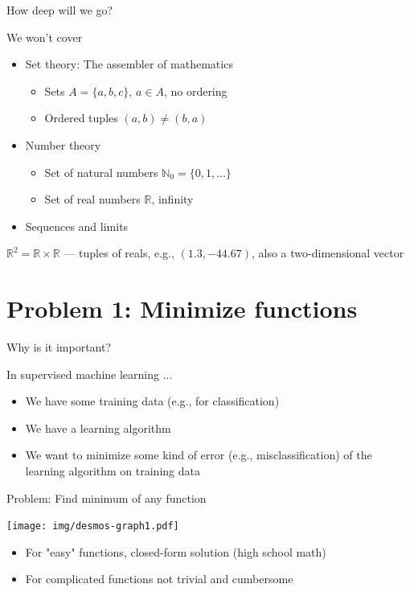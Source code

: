 \documentclass[12pt,aspectratio=169,handout]{beamer}
\begin{document}
\begin{frame}{How deep will we go?}
	
	We won't cover
	
	\begin{itemize}
		\item Set theory: The assembler of mathematics
		\begin{itemize}
			\item Sets $A = \{a, b, c\}$, $a \in A$, no ordering
			\item Ordered tuples $(a, b) \neq (b, a)$
		\end{itemize}
		\pause
		\item Number theory
		\begin{itemize}
			\item Set of natural numbers $\mathbb{N}_0 = \{0, 1, \ldots\}$
			\item Set of real numbers $\mathbb{R}$, infinity
		\end{itemize}
		\pause
		\item Sequences and limits
	\end{itemize}
	
	$\mathbb{R}^2 = \mathbb{R} \times \mathbb{R}$ --- tuples of reals, e.g., $(1.3, -44.67)$, also a two-dimensional vector
	
	
\end{frame}


\section{Problem 1: Minimize functions}

\begin{frame}{Why is it important?}

In supervised machine learning ...
	
\pause

	\begin{itemize}
		\item We have some training data (e.g., for classification)
		\item We have a learning algorithm
		\item We want to minimize some kind of error (e.g., misclassification) of the learning algorithm on training data
	\end{itemize}
	
\end{frame}


\begin{frame}{Problem: Find minimum of any function}
	
	\texttt{[image: img/desmos-graph1.pdf]}
	
	\begin{itemize}
		\item For "easy" functions, closed-form solution (high school math)
		\item For complicated functions not trivial and cumbersome
	\end{itemize}
	
	
	
\end{frame}
\end{document}

